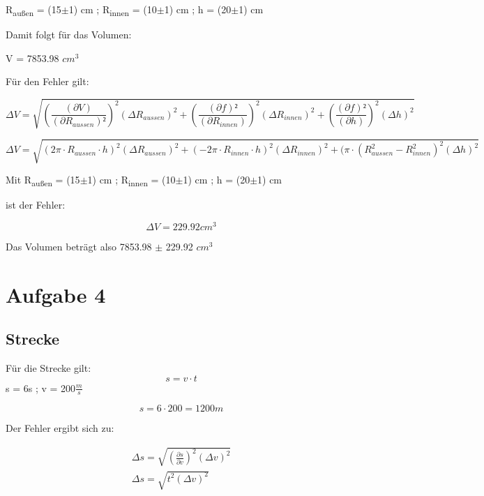 \documentclass{scrartcl}
\begin{document}
R\textsubscript{außen} = (15$\pm$1) cm ;
R\textsubscript{innen} = (10$\pm$1) cm ;
h = (20$\pm$1) cm

Damit folgt für das Volumen:

V = 7853.98 $cm^3$

Für den Fehler gilt: 

\begin{displaymath}
    \Delta V = \sqrt{\left(\frac{(\partial V)}{(\partial R_{aussen})²}\right)^2 (\Delta R_{aussen} )^2 +
                     \left(\frac{(\partial f)²}{(\partial R_{innen})}\right)^2 (\Delta R_{innen})^2 +
                     \left(\frac{(\partial f)²}{(\partial h)}\right)^2 (\Delta h)^2
    }
\end{displaymath}

\begin{displaymath}
    \Delta V = \sqrt{(2\pi \cdot R_{aussen} \cdot h)^2 (\Delta R_{aussen} )^2 +
                     (-2\pi \cdot R_{innen} \cdot h)^2 (\Delta R_{innen})^2 +
                     (\pi \cdot (R_{aussen}^2-R_{innen}^2)^2 (\Delta h)^2
    }
\end{displaymath}

Mit R\textsubscript{außen} = (15$\pm$1) cm ;
R\textsubscript{innen} = (10$\pm$1) cm ;
h = (20$\pm$1) cm 

ist der Fehler:

\begin{displaymath}
    \Delta V = 229.92 cm^3
\end{displaymath}

Das Volumen beträgt also 7853.98 $\pm$ 229.92 $cm^3$

\section{Aufgabe 4}
\subsection{Strecke}

Für die Strecke gilt:
\begin{displaymath}
    s = v \cdot t 
\end{displaymath}
s = 6s ; v = 200$\frac{m}{s}$

\begin{displaymath}
    s = 6 \cdot 200 = 1200m
\end{displaymath}

Der Fehler ergibt sich zu:

\begin{align}
    \Delta s = \sqrt{\left(\frac{\partial s}{\partial v}\right)^2 (\Delta v )^2} \\ \nonumber
    \Delta s = \sqrt{t^2 (\Delta v )^2} \nonumber
\end{align}
\end{document}
